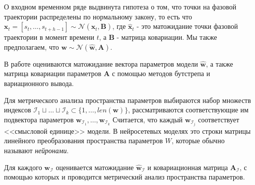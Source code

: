 \documentclass[12pt, twoside]{article}
\begin{document}
О входном временном ряде выдвинута гипотеза о том, что точки на фазовой траектории распределены по нормальному закону, то есть что $\mathbf{x}_t = [s_t, \dots, s_{t + h - 1}] \sim \mathcal{N}(\hat{\mathbf{x}}_t, \mathbf{B})$, где $\hat{\mathbf{x}}_t$ - это матожидание точки фазовой траектории в момент времени $t$, а $\mathbf{B}$ - матрица ковариации. Мы также предполагаем, что $\mathbf{w} \sim \mathcal{N}(\hat{\mathbf{w}}, \mathbf{A})$. 

В работе оцениваются матожидание вектора параметров модели $\hat{\mathbf{w}}$, а также матрица ковариации параметров $\mathbf{A}$ с помощью методов бутстрепа и вариационного вывода.

Для метрического анализа пространства параметров выбираются набор множеств индексов $\mathcal{I}_1 \sqcup \dots \sqcup \mathcal{I}_k \subset \{1, \dots, len(\mathbf{w})\}$, рассматриваются соответствующие им подвектора параметров $\mathbf{w}_{\mathcal{I}_1}, \dots, \mathbf{w}_{\mathcal{I}_k}$
Считается, что каждый $\mathbf{w}_{\mathcal{I}_j}$ соответствует <<смысловой единице>> модели. В нейросетевых моделях это строки матрицы линейного преобразования пространства параметров $W$, которые обычно называют \textit{нейронами}.

Для каждого $\mathbf{w}_{\mathcal{I}}$ оценивается матожидание $\hat{\mathbf{w}}_{\mathcal{I}}$ и ковариационная матрица $\mathbf{A}_{\mathcal{I}}$, с помощью которых и проводится метрический анализ пространства параметров.



\end{document}
